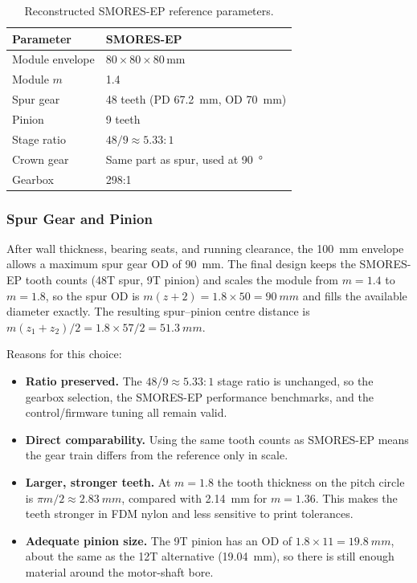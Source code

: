\documentclass[12pt,a4paper]{article}
\begin{document}
\begin{table}[H]
	\centering
	\caption{Reconstructed SMORES-EP reference parameters.}
	\label{tab:smores-ref}
	\begin{tabular}{ll}
		\toprule
		\textbf{Parameter} & \textbf{SMORES-EP} \\
		\midrule
		Module envelope & $80 \times 80 \times 80$\,mm \\
		Module $m$      & \num{1.4} \\
		Spur gear       & 48 teeth (PD \SI{67.2}{mm}, OD \SI{70}{mm}) \\
		Pinion          & 9 teeth \\
		Stage ratio     & $48/9 \approx 5.33{:}1$ \\
		Crown gear      & Same part as spur, used at \SI{90}{\degree} \\
		Gearbox         & 298:1 \\
		\bottomrule
	\end{tabular}
\end{table}

\subsubsection{Spur Gear and Pinion}

After wall thickness, bearing seats, and running clearance, the \SI{100}{mm}
envelope allows a maximum spur gear OD of \SI{90}{mm}. The final design keeps the
SMORES-EP tooth counts (48T spur, 9T pinion) and scales the module from
$m = 1.4$ to $m = 1.8$, so the spur OD is $m(z+2) = 1.8 \times 50 = \SI{90}{mm}$
and fills the available diameter exactly. The resulting spur--pinion centre
distance is $m(z_1+z_2)/2 = 1.8 \times 57 / 2 = \SI{51.3}{mm}$.

Reasons for this choice:
\begin{itemize}
	\item \textbf{Ratio preserved.} The $48/9 \approx 5.33{:}1$ stage ratio is
	      unchanged, so the gearbox selection, the SMORES-EP performance
	      benchmarks, and the control/firmware tuning all remain valid.
	\item \textbf{Direct comparability.} Using the same tooth counts as SMORES-EP
	      means the gear train differs from the reference only in scale.
	\item \textbf{Larger, stronger teeth.} At $m = 1.8$ the tooth thickness on the
	      pitch circle is $\pi m/2 \approx \SI{2.83}{mm}$, compared with
	      \SI{2.14}{mm} for $m = 1.36$. This makes the teeth stronger in FDM nylon
	      and less sensitive to print tolerances.
	\item \textbf{Adequate pinion size.} The 9T pinion has an OD of
	      $1.8 \times 11 = \SI{19.8}{mm}$, about the same as the 12T alternative
	      (\SI{19.04}{mm}), so there is still enough material around the
	      motor-shaft bore.
\end{itemize}
\end{document}
